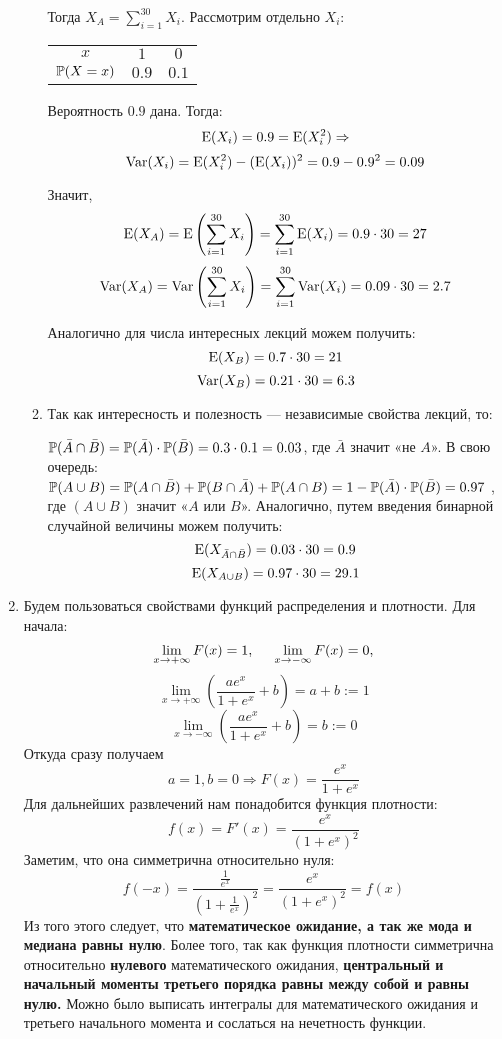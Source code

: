 \begin{enumerate}
\begin{enumerate}
Тогда $X_A = \sum\limits_{i=1}^{30}X_i$. Рассмотрим отдельно $X_i$:

\begin{center}
\begin{tabular}{@{}ccc@{}}
\toprule
$x$         & $1$             & $0$               \\
$\P(X=x)$ & $0.9$ & $0.1$ \\ \bottomrule
\end{tabular}
\end{center}

Вероятность $0.9$ дана. Тогда:
\[
\E(X_i) = 0.9 = \E(X^2_i) \Rightarrow
\]
\[
\Var(X_i) = \E(X^2_i) - (\E(X_i))^2 = 0.9 - 0.9^2 = 0.09
\]

Значит,
\[
\E(X_A) = \E\left(\sum\limits_{i=1}^{30}X_i\right) = \sum\limits_{i=1}^{30}\E(X_i)  =
0.9\cdot30 = 27
\]
\[
\Var(X_A) = \Var\left(\sum\limits_{i=1}^{30}X_i\right) = \sum\limits_{i=1}^{30}\Var(X_i) =
0.09\cdot30 = 2.7
\]

Аналогично для числа интересных лекций можем получить:
\[
\E(X_B) = 0.7\cdot 30 = 21
\]
\[
\Var(X_B) = 0.21\cdot 30 = 6.3
\]


\item Так как интересность и полезность — независимые свойства лекций, то:

$\P(\bar{A} \cap \bar{B}) = \P(\bar{A})\cdot \P(\bar{B}) = 0.3\cdot0.1 = 0.03$, где $\bar{A}$ значит «не $A$». В свою очередь:\\
 $\P(A\cup B) = \P(A\cap\bar{B}) + \P(B\cap\bar{A}) + \P(A\cap B) = 1 - \P(\bar{A})\cdot \P(\bar{B}) = 0.97$ , где $(A\cup B)$ значит «$A$  или $B$». Аналогично, путем введения бинарной случайной величины можем получить:
 \[
 \E(X_{\bar{A} \cap \bar{B}}) = 0.03 \cdot  30 = 0.9
 \]
 \[
 \E(X_{A\cup B}) = 0.97\cdot30 = 29.1
\]
\end{enumerate}

\item
Будем пользоваться свойствами функций распределения и плотности. Для начала:
\[
\lim\limits_{x \rightarrow +\infty} F(x) = 1, \hspace{0.5cm} \lim\limits_{x \rightarrow -\infty} F(x) = 0,
\]
\[
\lim\limits_{x \rightarrow +\infty} \left(\frac{ae^x}{1+e^x}+b\right) = a+b := 1
\]
\[
\lim\limits_{x \rightarrow -\infty} \left(\frac{ae^x}{1+e^x}+b\right) = b :=0
\]
Откуда сразу получаем
\[
a =1, b = 0 \Rightarrow F(x) = \frac{e^x}{1+e^x}
\]
Для дальнейших развлечений нам понадобится функция плотности:
\[
f(x) = F'(x) = \frac{e^x}{(1+e^x)^2}
\]
Заметим, что она симметрична относительно нуля:
\[
f(-x) = \frac{\frac{1}{e^x}}{\left(1+\frac{1}{e^x}\right)^2} = \frac{e^x}{(1+e^x)^2} = f(x)
\]
Из того этого следует, что \textbf{математическое ожидание, а так же мода и медиана
равны нулю}. Более того, так как функция плотности симметрична относительно
\textbf{нулевого} математического ожидания, \textbf{центральный и начальный моменты
третьего порядка равны между собой и равны нулю.} Можно было выписать интегралы
для математического ожидания и третьего начального момента и сослаться на нечетность функции.


\end{enumerate}
